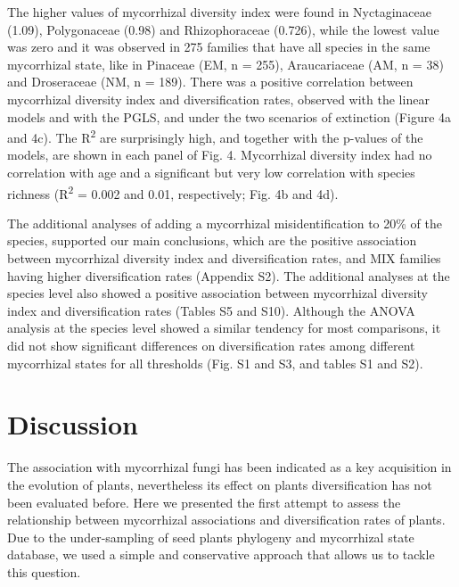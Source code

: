 \documentclass[12pt,]{article}
\begin{document}
The higher values of mycorrhizal diversity index were found in
Nyctaginaceae (1.09), Polygonaceae (0.98) and Rhizophoraceae (0.726),
while the lowest value was zero and it was observed in 275 families that
have all species in the same mycorrhizal state, like in Pinaceae (EM, n
= 255), Araucariaceae (AM, n = 38) and Droseraceae (NM, n = 189). There
was a positive correlation between mycorrhizal diversity index and
diversification rates, observed with the linear models and with the
PGLS, and under the two scenarios of extinction (Figure 4a and 4c). The
R\textsuperscript{2} are surprisingly high, and together with the
p-values of the models, are shown in each panel of Fig. 4. Mycorrhizal
diversity index had no correlation with age and a significant but very
low correlation with species richness (R\textsuperscript{2} = 0.002 and
0.01, respectively; Fig. 4b and 4d).

The additional analyses of adding a mycorrhizal misidentification to
20\% of the species, supported our main conclusions, which are the
positive association between mycorrhizal diversity index and
diversification rates, and MIX families having higher diversification
rates (Appendix S2). The additional analyses at the species level also
showed a positive association between mycorrhizal diversity index and
diversification rates (Tables S5 and S10). Although the ANOVA analysis
at the species level showed a similar tendency for most comparisons, it
did not show significant differences on diversification rates among
different mycorrhizal states for all thresholds (Fig. S1 and S3, and
tables S1 and S2).

\hypertarget{discussion}{%
\section{Discussion}\label{discussion}}

The association with mycorrhizal fungi has been indicated as a key
acquisition in the evolution of plants, nevertheless its effect on
plants diversification has not been evaluated before. Here we presented
the first attempt to assess the relationship between mycorrhizal
associations and diversification rates of plants. Due to the
under-sampling of seed plants phylogeny and mycorrhizal state database,
we used a simple and conservative approach that allows us to tackle this
question.
\end{document}
